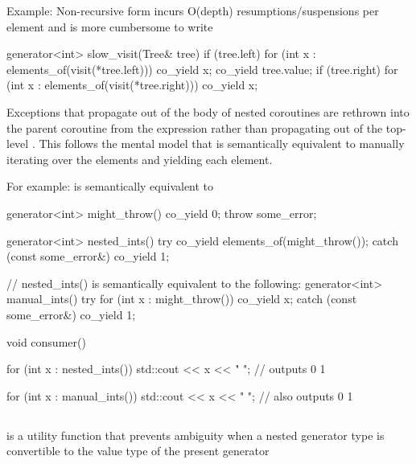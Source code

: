 \documentclass{wg21}
\begin{document}
Example: Non-recursive form incurs O(depth) resumptions/suspensions per element
and is more cumbersome to write

\begin{colorblock}
    generator<int> slow_visit(Tree& tree) {
        if (tree.left) {
            for (int x : elements_of(visit(*tree.left)))
            co_yield x;
        }
        co_yield tree.value;
        if (tree.right) {
            for (int x : elements_of(visit(*tree.right)))
            co_yield x;
        }
    }
\end{colorblock}

Exceptions that propagate out of the body of nested  coroutines
are rethrown into the parent coroutine from the  expression rather
than propagating out of the top-level . This follows the mental model that   is semantically equivalent to manually
iterating over the elements and yielding each element.

For example:  is semantically equivalent to 
\begin{colorblock}
    generator<int> might_throw() {
        co_yield 0;
        throw some_error{};
    }

    generator<int> nested_ints() {
        try {
            co_yield elements_of(might_throw());
        } catch (const some_error&) {}
        co_yield 1;
    }

    // nested_ints() is semantically equivalent to the following:
    generator<int> manual_ints() {
        try {
            for (int x : might_throw()) {
                co_yield x;
            }
        } catch (const some_error&) {}
        co_yield 1;
    }

    void consumer() {
        for (int x : nested_ints()) {
            std::cout << x << " "; // outputs 0 1
        }

        for (int x : manual_ints()) {
            std::cout << x << " "; // also outputs 0 1
        }
    }
\end{colorblock}

\subsection{}

 is a utility function that prevents ambiguity when a nested generator type is convertible to the value type
of the present generator
\end{document}

